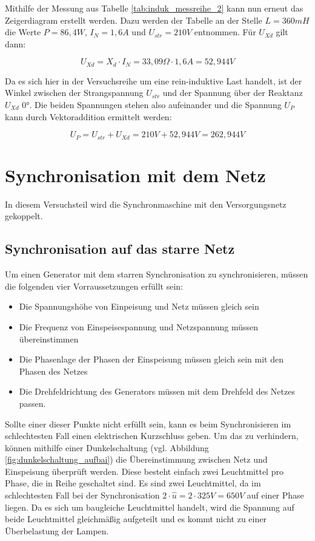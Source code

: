 \documentclass{report}
\begin{document}
Mithilfe der Messung aus Tabelle \ref{tab:induk_messreihe_2} kann nun erneut das Zeigerdiagram erstellt werden. Dazu werden der Tabelle an der Stelle $L=360mH$ die Werte $P=86,4W$, $I_{N} = 1,6A$ und $U_{str} = 210V$ entnommen. Für $U_{Xd}$ gilt dann:

\begin{equation}
	\label{eq:7}
	U_{Xd} = X_{d} \cdot I_{N} = 33,09\Omega \cdot 1,6A = 52,944V
\end{equation}

Da es sich hier in der Versuchsreihe um eine rein-induktive Last handelt, ist der Winkel zwischen der Strangspannung $U_{str}$ und der Spannung über der Reaktanz $U_{Xd}$ $0°$. Die beiden Spannungen stehen also aufeinander und die Spannung $U_{P}$ kann durch Vektoraddition ermittelt werden:

\begin{equation}
	\label{eq:8}
	U_{P} = U_{str} + U_{Xd} = 210V + 52,944V = 262,944V
\end{equation}


\section{Synchronisation mit dem Netz}
\label{sec:synchr-mit-dem}

In diesem Versuchsteil wird die Synchronmaschine mit den Versorgungsnetz gekoppelt.

\subsection{Synchronisation auf das starre Netz}
\label{sec:synchr-auf-das}

Um einen Generator mit dem starren Synchronisation zu synchronisieren, müssen die folgenden vier Vorraussetzungen erfüllt sein:

\begin{itemize}
	\item Die Spannungshöhe von Einpeisung und Netz müssen gleich sein
	\item Die Frequenz von Einspeisespannung und Netzspannung müssen übereinstimmen
	\item Die Phasenlage der Phasen der Einspeisung müssen gleich sein mit den Phasen des Netzes
	\item Die Drehfeldrichtung des Generators müssen mit dem Drehfeld des Netzes passen.
\end{itemize}

Sollte einer dieser Punkte nicht erfüllt sein, kann es beim Synchronisieren im schlechtesten Fall einen elektrischen Kurzschluss geben. Um das zu verhindern, können mithilfe einer Dunkelschaltung (vgl. Abbildung \ref{fig:dunkelschaltung_aufbai}) die Übereinstimmung zwischen Netz und Einspeisung überprüft werden. Diese besteht einfach zwei Leuchtmittel pro Phase, die in Reihe geschaltet sind. Es sind zwei Leuchtmittel, da im schlechtesten Fall bei der Synchronisation $2\cdot \hat{u} = 2\cdot 325V = 650V$ auf einer Phase liegen. Da es sich um baugleiche Leuchtmittel handelt, wird die Spannung auf beide Leuchtmittel gleichmäßig aufgeteilt und es kommt nicht zu einer Überbelastung der Lampen.
\end{document}
